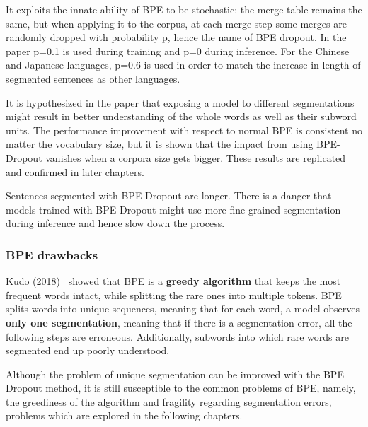 It exploits the innate ability of BPE to be stochastic: the merge table remains the same, but when applying it to the corpus, at each merge step some merges are randomly dropped with probability p, hence the name of BPE dropout. In the paper p=0.1 is used during training and p=0 during inference. For the Chinese and Japanese languages, p=0.6 is used in order to match the increase in length of segmented sentences as other languages.

It is hypothesized in the paper that exposing a model to different segmentations might result in better understanding of the whole words as well as their subword units. The performance improvement with respect to normal BPE is consistent no matter the vocabulary size, but it is shown that the impact from using BPE-Dropout vanishes when a corpora size gets bigger. These results are replicated and confirmed in later chapters.

Sentences segmented with BPE-Dropout are longer. There is a danger that models trained with BPE-Dropout might use more fine-grained segmentation during inference and hence slow down the process.

\subsubsection{BPE drawbacks}

Kudo (2018)~\cite{kudo-2018-subword} showed that BPE is a \textbf{greedy algorithm} that keeps the most frequent words intact, while splitting the rare ones into multiple tokens. BPE splits words into unique sequences, meaning that for each word, a model observes \textbf{only one segmentation}, meaning that if there is a segmentation error, all the following steps are erroneous. Additionally, subwords into which rare words are segmented end up poorly understood.

Although the problem of unique segmentation can be improved with the BPE Dropout method, it is still susceptible to the common problems of BPE, namely, the greediness of the algorithm and fragility regarding segmentation errors, problems which are explored in the following chapters.
